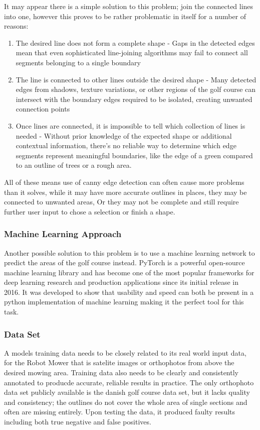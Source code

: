 \documentclass[final]{cmpreport_02}
\begin{document}
It may appear there is a simple solution to this problem; join the connected lines into one, however this proves to be rather problematic in itself for a number of reasons:
\begin{enumerate}
	\item The desired line does not form a complete shape - Gaps in the detected edges mean that even sophisticated line-joining algorithms may fail to connect all segments belonging to a single boundary

	\item The line is connected to other lines outside the desired shape - Many detected edges from shadows, texture variations, or other regions of the golf course can intersect with the boundary edges required to be isolated, creating unwanted connection points

	\item Once lines are connected, it is impossible to tell which collection of lines is needed - Without prior knowledge of the expected shape or additional contextual information, there's no reliable way to determine which edge segments represent meaningful boundaries, like the edge of a green compared to an outline of trees or a rough area.
\end{enumerate}
All of these means use of canny edge detection can often cause more problems than it solves, while it may have more accurate outlines in places, they may be connected to unwanted areas, Or they may not be complete and still require further user input to chose a selection or finish a shape.

\subsubsection{Machine Learning Approach}
Another possible solution to this problem is to use a machine learning network to predict the areas of the golf course instead.
PyTorch \citep{paszke2019pytorch} is a powerful open-source machine learning library and has become one of the most popular frameworks for deep learning research and production applications since its initial release in 2016.
It was developed to show that usability and speed can both be present in a python implementation of machine learning making it the perfect tool for this task.




\subsubsection{Data Set}
A models training data needs to be closely related to its real world input data, for the Robot Mower that is satelite images or orthophotos from above the desired mowing area.
Training data also needs to be clearly and consistently annotated to producde accurate, reliable results in practice.
The only orthophoto data set publicly available is the danish golf course data set, but it lacks quality and consistency; the outlines do not cover the whole area of single sections and often are missing entirely.
Upon testing the data, it produced faulty results including both true negative and false positives. ~
\end{document}
